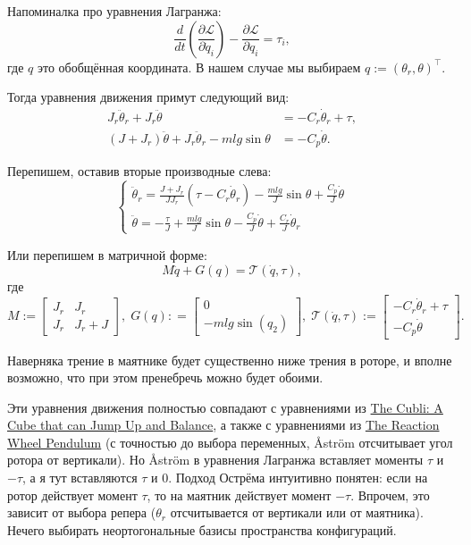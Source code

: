 \documentclass{article}
\begin{document}
Напоминалка про уравнения Лагранжа:
$$
\frac{d}{dt}\left(\frac{\partial\mathcal L}{\partial\dot q_i}\right) - \frac{\partial\mathcal L}{\partial q_i} = \tau_i,
$$
где $q$ это обобщённая координата. В нашем случае мы выбираем $q:=(\theta_r, \theta)^\top$.

Тогда уравнения движения примут следующий вид:
\begin{align*}
J_r\ddot\theta_r + J_r\ddot\theta&= - C_r \dot\theta_r + \tau,\\
(J+J_r)\ddot \theta + J_r\ddot\theta_r - mlg\sin\theta &= - C_p \dot\theta.
\end{align*}

Перепишем, оставив вторые производные слева:
$$
\left\{
\begin{array}{l}
\ddot\theta_r = \frac{J+J_r}{J J_r}(\tau - C_r\dot\theta_r) - \frac{mlg}{J}\sin\theta + \frac{C_p}{J}\dot\theta\\
\ddot\theta   = -\frac{\tau}{J} + \frac{ml g}{J}\sin\theta  - \frac{C_p}{J} \dot\theta + \frac{C_r}{J} \dot\theta_r
\end{array}
\right.
$$

Или перепишем в матричной форме:
\[
	M\ddot{q} + G(q) =\mathcal{T}(\dot{q},\tau),
\]
где
\[
	M := \begin{bmatrix} J_r & J_r \\
						 J_r & J_r+J
		 \end{bmatrix},
	\;
	G(q): = \begin{bmatrix} 0 \\ -mlg \sin(q_2) \end{bmatrix},
	\;
	\mathcal{T}(\dot{q},\tau) := \begin{bmatrix} - C_r \dot\theta_r + \tau \\ - C_p \dot\theta \end{bmatrix}.
\]

Наверняка трение в маятнике будет существенно ниже трения в роторе, и вполне возможно, что при этом пренебречь можно будет обоими. 


{\color{blue} Эти уравнения движения полностью совпадают с уравнениями из \href{https://www.ethz.ch/content/dam/ethz/special-interest/mavt/dynamic-systems-n-control/idsc-dam/Research_DAndrea/Cubli/Cubli_IROS2012.pdf}{The Cubli: A Cube that can Jump Up and Balance}, а также с уравнениями из \href{https://dl.acm.org/citation.cfm?id=3019246}{The Reaction Wheel Pendulum} (с точностью до выбора переменных, Åström отсчитывает угол ротора от вертикали). Но Åström в уравнения Лагранжа вставляет моменты $\tau$ и $-\tau$, а я тут вставляются $\tau$ и 0. Подход Острёма интуитивно понятен: если на ротор действует момент $\tau$, то на маятник действует момент $-\tau$. Впрочем, это зависит от выбора репера ($\theta_r$ отсчитывается от вертикали или от маятника). Нечего выбирать неортогональные базисы пространства конфигураций.}
\end{document}

